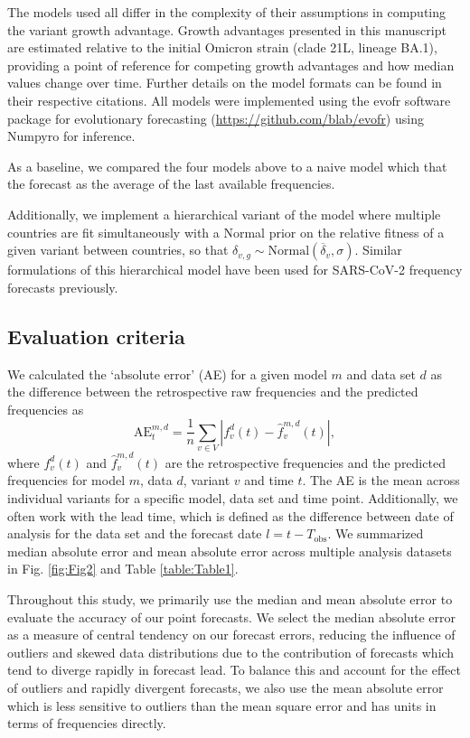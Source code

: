 The models used all differ in the complexity of their assumptions in computing the variant growth advantage.
Growth advantages presented in this manuscript are estimated relative to the initial Omicron strain (clade 21L, lineage BA.1), providing a point of reference for competing growth advantages and how median values change over time.
Further details on the model formats can be found in their respective citations.
All models were implemented using the evofr software package for evolutionary forecasting (\href{https://github.com/blab/evofr}{https://github.com/blab/evofr}) using Numpyro for inference.

As a baseline, we compared the four models above to a naive model which that the forecast as the average of the last available frequencies.

Additionally, we implement a hierarchical variant of the model where multiple countries are fit simultaneously with a Normal prior on the relative fitness of a given variant between countries, so that $\delta_{v, g} \sim \text{Normal}(\overline{\delta}_{v}, \sigma)$.
Similar formulations of this hierarchical model have been used for SARS-CoV-2 frequency forecasts previously. \cite{susswein2023leveraging}

\subsection*{Evaluation criteria}

We calculated the `absolute error' (AE) for a given model $m$ and data set $d$ as the difference between the retrospective raw frequencies and the predicted frequencies as
\begin{equation}
    \mathrm{AE}_{t}^{m,d} = \frac{1}{n} \sum_{v \in V} \left|f_{v}^{d}(t) - \hat{f}^{m,d}_{v}(t) \right|,
\end{equation}
where $f_{v}^{d}(t)$ and $\hat{f}_{v}^{m,d}(t)$ are the retrospective frequencies and the predicted frequencies for model $m$, data $d$, variant $v$ and time $t$.
The AE is the mean across individual variants for a specific model, data set and time point.
Additionally, we often work with the lead time, which is defined as the difference between date of analysis for the data set and the forecast date $l = t - T_{\text{obs}}$.
We summarized median absolute error and mean absolute error across multiple analysis datasets in Fig. \ref{fig:Fig2} and Table \ref{table:Table1}.

Throughout this study, we primarily use the median and mean absolute error to evaluate the accuracy of our point forecasts.
We select the median absolute error as a measure of central tendency on our forecast errors, reducing the influence of outliers and skewed data distributions due to the contribution of forecasts which tend to diverge rapidly in forecast lead.
To balance this and account for the effect of outliers and rapidly divergent forecasts, we also use the mean absolute error which is less sensitive to outliers than the mean square error and has units in terms of frequencies directly.

